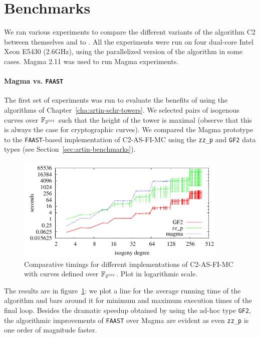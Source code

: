 \section{Benchmarks}
\label{sec:benchmarks}
We ran various experiments to compare the different variants of the
algorithm C2 between themselves and to
. All the experiments were
run on four dual-core Intel Xeon E5430 (2.6GHz), using the
parallelized version of the algorithm in some cases. Magma 2.11 was
used to run Magma experiments.

\paragraph{Magma vs. \texttt{FAAST}}
\label{sec:magma-vs.-textttf}
The first set of experiments was run to evaluate the benefits of using
the algorithms of Chapter~\ref{cha:artin-schr-towers}. We selected
pairs of isogenous curves over $\mathbb{F}_{2^{101}}$ such that the height of
the tower is maximal (observe that this is always the case for
cryptographic curves).  We compared the Magma prototype to the
\texttt{FAAST}-based implementation of C2-AS-FI-MC using the
\texttt{zz\_p} and \texttt{GF2} data types (see
Section~\ref{sec:artin-benchmarks}).

\begin{figure}
  \centering
  \includegraphics[width=0.9\textwidth]{isogeny/p2}
  \caption{Comparative timings for different implementations of C2-AS-FI-MC with curves defined over $\mathbb{F}_{2^{101}}$. Plot in logarithmic scale.}
  \label{fig:2-101}
\end{figure}

The results are in figure~\ref{fig:2-101}: we plot a line for the
average running time of the algorithm and bars around it for minimum
and maximum execution times of the final loop. Besides the dramatic
speedup obtained by using the ad-hoc type \texttt{GF2}, the
algorithmic improvements of \texttt{FAAST} over Magma are evident as
even \texttt{zz\_p} is one order of magnitude faster.

